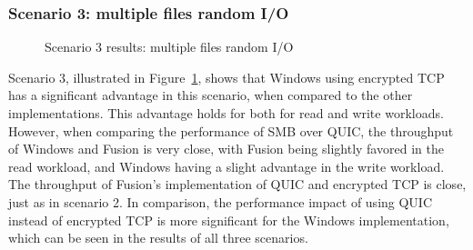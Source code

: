 \documentclass[english, 12pt, a4paper, elec, utf8, a-2b, online]{aaltothesis}
\begin{document}
\subsubsection{Scenario 3: multiple files random I/O}
\begin{figure}[h]
\centering
{}

\caption{Scenario 3 results: multiple files random I/O}
\label{fig:scenario_3}
\end{figure}

Scenario 3, illustrated in Figure~\ref{fig:scenario_3}, shows that
Windows using encrypted TCP has a significant advantage in this scenario, when compared
to the other implementations. This advantage holds for both for read and write workloads.
However, when comparing the performance of SMB over QUIC, the
throughput of Windows and Fusion is very close, with Fusion being slightly favored
in the read workload, and Windows having a slight advantage in the write workload.
The throughput of Fusion's implementation of QUIC and encrypted TCP is close, just as
in scenario 2. In comparison, the performance impact of using QUIC instead of
encrypted TCP is more significant for the Windows implementation, which can be seen
in the results of all three scenarios.
\end{document}
